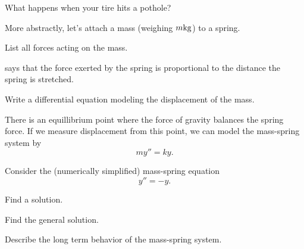
\begin{applicationActivities}

\begin{observation}
What happens when your tire hits a pothole?



\end{observation}

\begin{activity}{5}
More abstractly, let's attach a mass (weighing \(m {\rm kg}\)) to a spring.

\begin{center}
\springmass
\end{center}
\vfill
List all forces acting on the mass.
\end{activity}

\begin{activity}{5}
 says that the force exerted by the spring is proportional to the distance the spring is stretched.

\begin{center}
\springmass
\end{center}
\vfill
Write a differential equation modeling the displacement of the mass.
\end{activity}

\begin{observation}
There is an equillibrium point where the force of gravity balances the spring force.  If we measure displacement from this point, we can model the mass-spring system by
\[my''=ky.\]
\vfill
\begin{center}
\springmass
\end{center}
\end{observation}

\begin{activity}{15}
Consider the (numerically simplified) mass-spring equation \[y''=-y.\]
\begin{subactivity}
Find a solution.
\end{subactivity}
\begin{subactivity}
Find the general solution.
\end{subactivity}
\begin{subactivity}
Describe the long term behavior of the mass-spring system.
\end{subactivity}
\end{activity}


\end{applicationActivities}
